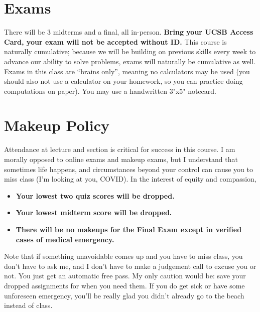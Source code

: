 \documentclass[11pt,letterpaper]{article}
\begin{document}
\section*{Exams}
There will be 3 midterms and a final, all in-person. \textbf{Bring your UCSB Access Card, your exam will not be accepted without ID.} This course is naturally cumulative; because we will be building on previous skills every week to advance our ability to solve problems, exams will naturally be cumulative as well. Exams in this class are “brains only”, meaning no calculators may be used (you should also not use a calculator on your homework, so you can practice doing computations on paper). You may use a handwritten 3"x5" notecard. 

\section*{Makeup Policy}
Attendance at lecture and section is critical for success in this course. I am morally opposed to online exams and makeup exams, but I understand that sometimes life happens, and circumstances beyond your control can cause you to miss class (I’m looking at you, COVID). In the interest of equity and compassion, 
\begin{itemize}[nosep]
\item \textbf{Your lowest two quiz scores will be dropped.}
\item \textbf{Your lowest midterm score will be dropped.}
\item \textbf{There will be no makeups for the Final Exam except in verified cases of medical emergency.}
\end{itemize}
Note that if something unavoidable comes up and you have to miss class, you don’t have to ask me, and I don’t have to make a judgement call to excuse you or not. You just get an automatic free pass. My only caution would be: save your dropped assignments for when you need them. If you do get sick or have some unforeseen emergency, you’ll be really glad you didn’t already go to the beach instead of class. 
\end{document}
